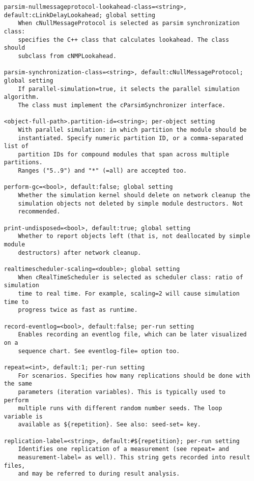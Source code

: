 \begin{verbatim}
parsim-nullmessageprotocol-lookahead-class=<string>, default:cLinkDelayLookahead; global setting
    When cNullMessageProtocol is selected as parsim synchronization class:
    specifies the C++ class that calculates lookahead. The class should
    subclass from cNMPLookahead.

parsim-synchronization-class=<string>, default:cNullMessageProtocol; global setting
    If parallel-simulation=true, it selects the parallel simulation algorithm.
    The class must implement the cParsimSynchronizer interface.

<object-full-path>.partition-id=<string>; per-object setting
    With parallel simulation: in which partition the module should be
    instantiated. Specify numeric partition ID, or a comma-separated list of
    partition IDs for compound modules that span across multiple partitions.
    Ranges ("5..9") and "*" (=all) are accepted too.

perform-gc=<bool>, default:false; global setting
    Whether the simulation kernel should delete on network cleanup the
    simulation objects not deleted by simple module destructors. Not
    recommended.

print-undisposed=<bool>, default:true; global setting
    Whether to report objects left (that is, not deallocated by simple module
    destructors) after network cleanup.

realtimescheduler-scaling=<double>; global setting
    When cRealTimeScheduler is selected as scheduler class: ratio of simulation
    time to real time. For example, scaling=2 will cause simulation time to
    progress twice as fast as runtime.

record-eventlog=<bool>, default:false; per-run setting
    Enables recording an eventlog file, which can be later visualized on a
    sequence chart. See eventlog-file= option too.

repeat=<int>, default:1; per-run setting
    For scenarios. Specifies how many replications should be done with the same
    parameters (iteration variables). This is typically used to perform
    multiple runs with different random number seeds. The loop variable is
    available as ${repetition}. See also: seed-set= key.

replication-label=<string>, default:#${repetition}; per-run setting
    Identifies one replication of a measurement (see repeat= and
    measurement-label= as well). This string gets recorded into result files,
    and may be referred to during result analysis.


\end{verbatim}
